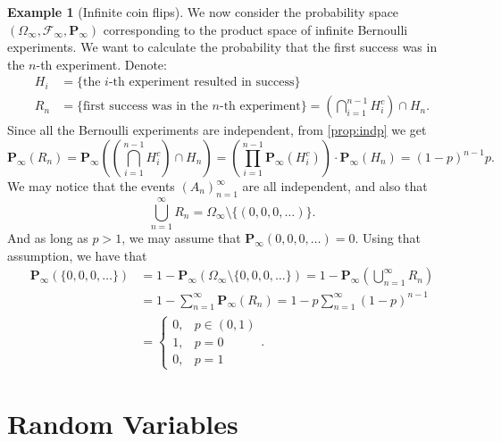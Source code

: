 \documentclass[11pt,a4paper]{article}
\theoremstyle{definition}
\newtheorem{example}{Example}[section]
\theoremstyle{plain}
\begin{document}
  \begin{example}[Infinite coin flips]
    We now consider the probability space 
    $(\Omega_{\infty}, \mathcal F_{\infty}, \mathbf P_{\infty})$
    corresponding to the product space of infinite Bernoulli experiments.
    We want to calculate the probability that the first success was in 
    the $n$-th experiment. Denote:
    \begin{align*}
      H_i &= \{\text{the $i$-th experiment resulted in success}\} \\
      R_n &= \{\text{first success was in the $n$-th experiment}\} = 
      \left(\bigcap_{i=1}^{n-1} H_i^c\right) \cap H_n.
    \end{align*}
    Since all the Bernoulli experiments are independent, from 
    \autoref{prop:indp} we get
    \[
      \mathbf{P}_{\infty}(R_{n}) = 
      \mathbf{P}_{\infty} \left(\left(\bigcap_{i=1}^{n-1} H_i^c\right) \cap H_n\right) = 
      \left(\prod_{i=1}^{n-1} \mathbf{P}_{\infty} \left(H_{i}^{c}\right)\right) \cdot \mathbf{P}_{\infty} \left(H_{n}\right) =
      (1-p)^{n-1}p.
    \]
    We may notice that the events $(A_n)_{n=1}^{\infty}$ are all independent,
    and also that
    \[
      \bigcup_{n=1}^{\infty} R_n = \Omega_\infty \setminus \{(0,0,0,\dots)\}.
    \]
    And as long as $p > 1$, we may assume that 
    $\mathbf P_\infty(0,0,0,\dots) = 0$.
    Using that assumption, we have that
    \begin{align*}
      \mathbf P_{\infty}(\{0,0,0,\dots\}) &= 
      1 - \mathbf P_\infty(\Omega_\infty \setminus \{0,0,0,\dots\}) =
      1 - \mathbf P_\infty(\bigcup_{n=1}^{\infty} R_n) \\ &=
      1 - \sum_{n=1}^{\infty} \mathbf P_\infty(R_n) =
      1 - p \sum_{n=1}^{\infty} (1-p)^{n-1} \\ &=
      \begin{cases}
        0, &p \in (0,1) \\
        1, &p = 0 \\
        0, &p = 1
      \end{cases}.
    \end{align*}
  \end{example}

  \newpage

  \section{Random Variables}
\end{document}
